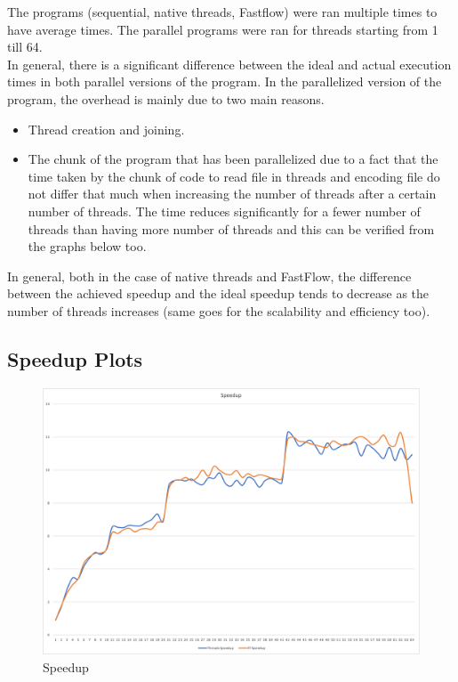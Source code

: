 \documentclass[12pt, letterpaper]{article}  %
\begin{document}
The programs (sequential, native threads, Fastflow) were ran multiple times to have average times. The parallel programs were ran for threads starting from 1 till 64. \\

In general, there is a significant difference between the ideal and actual execution times in both parallel versions of the program. In the parallelized version of the program, the overhead is mainly due to two main reasons.
\begin{itemize}
    \item Thread creation and joining.
    \item The chunk of the program that has been parallelized due to a fact that the time taken by the chunk of code to read file in threads and encoding file do not differ that much when increasing the number of threads after a certain number of threads. The time reduces significantly for a fewer number of threads than having more number of threads and this can be verified from the graphs below too.
\end{itemize}

In general, both in the case of native threads and FastFlow, the difference between the achieved speedup and the ideal speedup tends to decrease as the number of threads increases (same goes for the scalability and efficiency too).

\subsection{Speedup Plots}
\begin{figure}[H]
\centering
    \includegraphics[width=1 \textwidth]{Images/speedup.png}
    \caption{Speedup}
\end{figure}
\end{document}
